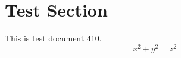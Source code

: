 \documentclass{article}
\begin{document}
\section{Test Section}
This is test document 410.
\begin{equation}
x^2 + y^2 = z^2
\end{equation}
\end{document}

